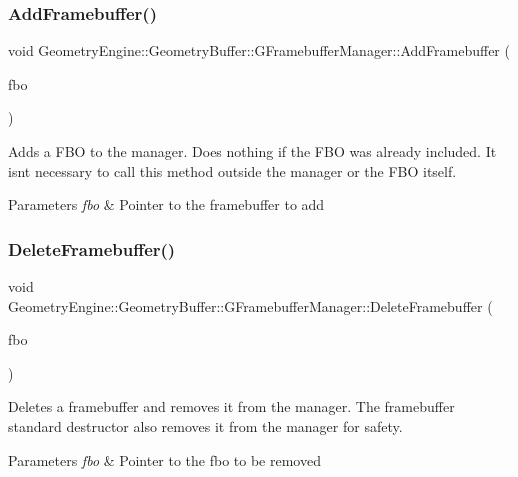 \subsubsection{\texorpdfstring{AddFramebuffer()}{AddFramebuffer()}}
{\footnotesize\ttfamily void Geometry\+Engine\+::\+Geometry\+Buffer\+::\+G\+Framebuffer\+Manager\+::\+Add\+Framebuffer (\begin{DoxyParamCaption}\item[{\mbox{\hyperlink{class_geometry_engine_1_1_geometry_buffer_1_1_g_framebuffer_object}{G\+Framebuffer\+Object}} $\ast$}]{fbo }\end{DoxyParamCaption})}

Adds a F\+BO to the manager. Does nothing if the F\+BO was already included. It isn\textquotesingle{}t necessary to call this method outside the manager or the F\+BO itself. 
\begin{DoxyParams}{Parameters}
{\em fbo} & Pointer to the framebuffer to add \\
\hline
\end{DoxyParams}
\mbox{\label{class_geometry_engine_1_1_geometry_buffer_1_1_g_framebuffer_manager_a53ef67132cb5556dc5fd60d01c3a6b9e}} 
\subsubsection{\texorpdfstring{DeleteFramebuffer()}{DeleteFramebuffer()}}
{\footnotesize\ttfamily void Geometry\+Engine\+::\+Geometry\+Buffer\+::\+G\+Framebuffer\+Manager\+::\+Delete\+Framebuffer (\begin{DoxyParamCaption}\item[{\mbox{\hyperlink{class_geometry_engine_1_1_geometry_buffer_1_1_g_framebuffer_object}{G\+Framebuffer\+Object}} $\ast$}]{fbo }\end{DoxyParamCaption})}

Deletes a framebuffer and removes it from the manager. The framebuffer standard destructor also removes it from the manager for safety. 
\begin{DoxyParams}{Parameters}
{\em fbo} & Pointer to the fbo to be removed \\
\hline
\end{DoxyParams}
\mbox{\label{class_geometry_engine_1_1_geometry_buffer_1_1_g_framebuffer_manager_a4409dc69749e27c6864b25a76b1bcec9}} 
